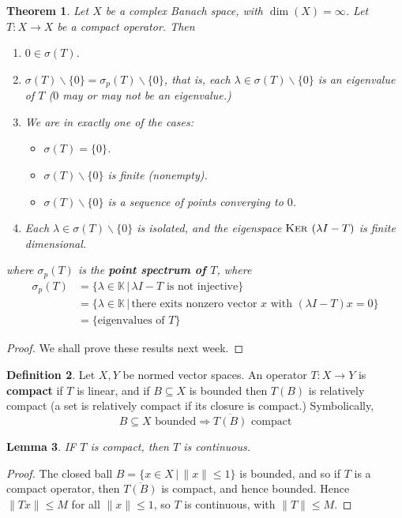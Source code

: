 \documentclass[10pt, reqno, oneside]{amsart}
\theoremstyle{plain}%
\newtheorem{thm}{Theorem}[section]
\newtheorem{lem}[thm]{Lemma}
\theoremstyle{definition}
\newtheorem{defn}[thm]{Definition}
\theoremstyle{remark}
\newcommand{\given}{ \, | \,}
\newcommand{\K}{\mathbb{K}}
\renewcommand{\ker}{\textsc{Ker\ }}
\begin{document}
\begin{thm}
	Let $X$ be a complex Banach space, with $\dim(X) = \infty$.  Let $T : X \rightarrow X$ be a compact operator.  Then \begin{enumerate}[(1)]
		\item $0 \in \sigma(T)$.  
		\item $\sigma(T) \backslash \{ 0 \} = \sigma_p(T) \backslash \{ 0 \}$, that is, each $\lambda \in \sigma(T) \backslash \{ 0 \}$ is an eigenvalue of $T$ ($0$ may or may not be an eigenvalue.)
		\item We are in exactly one of the cases:
		 \begin{itemize}
		 	\item $\sigma(T) = \{ 0 \}$.
		 	\item $\sigma(T) \backslash \{ 0 \}$ is finite (nonempty).
		 	\item $\sigma(T) \backslash \{ 0 \}$ is a sequence of points converging to $0$.  
		 \end{itemize}
		 \item Each $\lambda \in \sigma(T) \backslash \{ 0 \}$ is isolated, and the eigenspace $\ker(\lambda I - T)$ is finite dimensional.  
	\end{enumerate}  
	where $\sigma_p(T)$ is the \textbf{point spectrum of $T$}, where \begin{align*}
		\sigma_p(T) &= \{ \lambda \in \K \given \text{$\lambda I - T$ is not injective}\} \\
		 			&= \{ \lambda \in \K \given \text{there exits nonzero vector $x$ with $(\lambda I - T)x = 0$}\} \\
					&= \{ \text{eigenvalues of $T$} \}
	\end{align*}
	
\end{thm}
\begin{proof}
	We shall prove these results next week.
\end{proof}

\begin{defn}
	Let $X, Y$ be normed vector spaces.  An operator $T : X \rightarrow Y$ is \textbf{compact} if $T$ is linear, and if $B \subseteq X$ is bounded then $T(B) $ is relatively compact (a set is relatively compact if its closure is compact.)  Symbolically, \[
		\text{$B\subseteq X$ bounded} \Rightarrow \text{$\overline{T(B)}$ compact}
	\]
\end{defn}

\begin{lem}
	IF $T$ is compact, then $T$ is continuous.
\end{lem}
\begin{proof}
	The closed ball $B  = \{ x \in X \given \| x \| \leq 1 \}$ is bounded, and so if $T$ is a compact operator, then $\overline{T(B)}$ is compact, and hence bounded.  Hence $\| Tx \| \leq M$ for all $\| x \| \leq 1$, so $T$ is continuous, with $\| T \| \leq M$.  
\end{proof}
\end{document}
